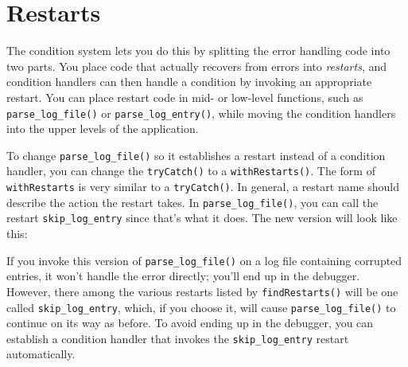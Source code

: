 \hypertarget{restarts}{%
\section{Restarts}\label{restarts}}

The condition system lets you do this by splitting the error handling
code into two parts. You place code that actually recovers from errors
into \emph{restarts}, and condition handlers can then handle a condition
by invoking an appropriate restart. You can place restart code in mid-
or low-level functions, such as \texttt{parse\_log\_file()} or
\texttt{parse\_log\_entry()}, while moving the condition handlers into
the upper levels of the application.

To change \texttt{parse\_log\_file()} so it establishes a restart
instead of a condition handler, you can change the \texttt{tryCatch()}
to a \texttt{withRestarts()}. The form of \texttt{withRestarts} is very
similar to a \texttt{tryCatch()}. In general, a restart name should
describe the action the restart takes. In \texttt{parse\_log\_file()},
you can call the restart \texttt{skip\_log\_entry} since that's what it
does. The new version will look like this:

\begin{Shaded}
\begin{Highlighting}[]
\StringTok{ }
\StringTok{ }
  
    \NormalTok{(}
       
\NormalTok{    )}
\NormalTok{  \})}
\NormalTok{\}}
\end{Highlighting}
\end{Shaded}

If you invoke this version of \texttt{parse\_log\_file()} on a log file
containing corrupted entries, it won't handle the error directly; you'll
end up in the debugger. However, there among the various restarts listed
by \texttt{findRestarts()} will be one called \texttt{skip\_log\_entry},
which, if you choose it, will cause \texttt{parse\_log\_file()} to
continue on its way as before. To avoid ending up in the debugger, you
can establish a condition handler that invokes the
\texttt{skip\_log\_entry} restart automatically.

